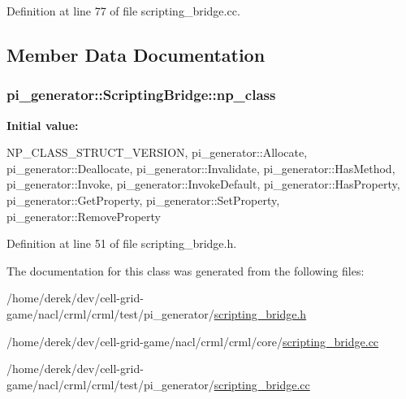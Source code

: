 Definition at line 77 of file scripting\_\-bridge.cc.



\subsection{Member Data Documentation}
\hypertarget{classpi__generator_1_1_scripting_bridge_a1756e8dff7625cda7697f3e9725ede25}{
\subsubsection[{np\_\-class}]{ {\bf pi\_\-generator::ScriptingBridge::np\_\-class}}}
\label{classpi__generator_1_1_scripting_bridge_a1756e8dff7625cda7697f3e9725ede25}
{\bfseries Initial value:}
\begin{DoxyCode}
 {
  NP_CLASS_STRUCT_VERSION,
  pi_generator::Allocate,
  pi_generator::Deallocate,
  pi_generator::Invalidate,
  pi_generator::HasMethod,
  pi_generator::Invoke,
  pi_generator::InvokeDefault,
  pi_generator::HasProperty,
  pi_generator::GetProperty,
  pi_generator::SetProperty,
  pi_generator::RemoveProperty
}
\end{DoxyCode}


Definition at line 51 of file scripting\_\-bridge.h.



The documentation for this class was generated from the following files:\begin{DoxyCompactItemize}
\item 
/home/derek/dev/cell-\/grid-\/game/nacl/crml/crml/test/pi\_\-generator/\hyperlink{test_2pi__generator_2scripting__bridge_8h}{scripting\_\-bridge.h}\item 
/home/derek/dev/cell-\/grid-\/game/nacl/crml/crml/core/\hyperlink{core_2scripting__bridge_8cc}{scripting\_\-bridge.cc}\item 
/home/derek/dev/cell-\/grid-\/game/nacl/crml/crml/test/pi\_\-generator/\hyperlink{test_2pi__generator_2scripting__bridge_8cc}{scripting\_\-bridge.cc}\end{DoxyCompactItemize}
